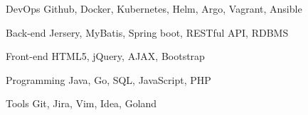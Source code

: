 

\begin{cvskills}

  \cvskill
    {DevOps} %
    {Github, Docker, Kubernetes, Helm, Argo, Vagrant, Ansible} %

  \cvskill
    {Back-end} %
    {Jersery, MyBatis, Spring boot, RESTful API, RDBMS} %

  \cvskill
    {Front-end} %
    {HTML5, jQuery, AJAX, Bootstrap} %

  \cvskill
    {Programming} %
    {Java, Go, SQL, JavaScript, PHP} %

  \cvskill
    {Tools} %
    {Git, Jira, Vim, Idea, Goland} %

\end{cvskills}
